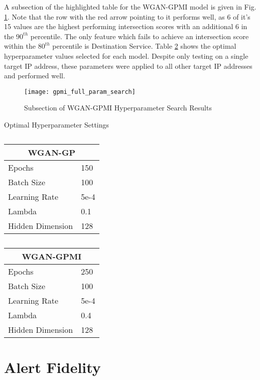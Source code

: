 A subsection of the highlighted table for the WGAN-GPMI model is given in Fig. \ref{fig:highlighted_param_gpmi}. Note that the row with the red arrow pointing to it performs well, as 6 of it's 15 values are the highest performing intersection scores with an additional 6 in the $90^{th}$ percentile. The only feature which fails to achieve an intersection score within the $80^{th}$ percentile is Destination Service. Table \ref{tab:params} shows the optimal hyperparameter values selected for each model. Despite only testing on a single target IP address, these parameters were applied to all other target IP addresses and performed well.

\begin{figure}[!htbp]
	\centering
	\texttt{[image: gpmi\_full\_param\_search]}
	\caption{
		Subsection of WGAN-GPMI Hyperparameter Search Results
	}
	\label{fig:highlighted_param_gpmi}
\end{figure}

\begin{table}[!htb]
	\centering
	\caption{Optimal Hyperparameter Settings}
	\label{tab:params}
	\begin{subtable}{.5\linewidth}
		\centering
		\caption{}
		\begin{tabular}{l|l}
			\hline
			\multicolumn{2}{c}{\textbf{WGAN-GP}} \\
			\hline
			Epochs & 150 \\
			Batch Size & 100 \\
			Learning Rate & 5e-4 \\
			Lambda & 0.1 \\
			Hidden Dimension & 128
		\end{tabular}
	\end{subtable}%
	\begin{subtable}{.5\linewidth}
		\centering
		\caption{}
		\begin{tabular}{l|l}
			\hline
			\multicolumn{2}{c}{\textbf{ WGAN-GPMI}} \\
			\hline
			Epochs & 250 \\
			Batch Size & 100 \\
			Learning Rate & 5e-4 \\
			Lambda & 0.4 \\
			Hidden Dimension & 128
		\end{tabular}
	\end{subtable}%
\end{table}

\section{Alert Fidelity}
\label{sec:fidel}

